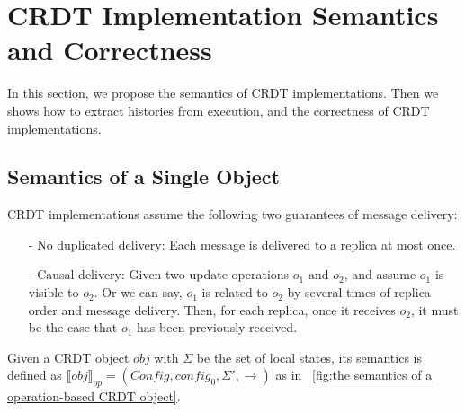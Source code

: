 
\section{CRDT Implementation Semantics and Correctness}
\label{sec:CRDT implementation semantics and correctness}

In this section, we propose the semantics of %
CRDT implementations. Then we shows how to extract histories from execution, and the correctness of CRDT implementations.



\subsection{Semantics of a Single Object}
\label{subsec:semantics of a single object}

CRDT implementations assume the following two guarantees of message delivery:

\begin{itemize}
\setlength{\itemsep}{0.5pt}
\item[-] No duplicated delivery: Each message is delivered to a replica at most once.
\item[-] Causal delivery: Given two update operations $o_1$ and $o_2$, and assume $o_1$ is visible to $o_2$. Or we can say, $o_1$ is related to $o_2$ by several times of replica order and message delivery. Then, for each replica, once it receives $o_2$, it must be the case that $o_1$ has been previously received.
\end{itemize}

Given a CRDT object $\mathit{obj}$ with $\Sigma$ be the set of local states, its semantics is defined as $\llbracket \mathit{obj} \rrbracket_{\mathit{op}} = (\mathit{Config},\mathit{config}_0,\Sigma',\rightarrow)$ as in \figurename~\ref{fig:the semantics of a operation-based CRDT object}.



